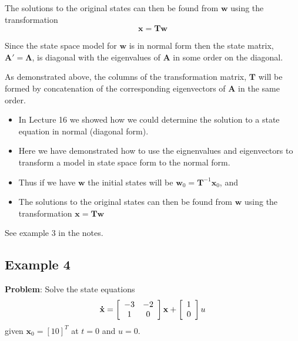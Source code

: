 The solutions to the original states can then be found from $\mathbf{w}$ using the transformation
\[
\mathbf{x}=\mathbf{Tw}
\]

Since the state space model for $\mathbf{w}$ is in normal form then the state matrix, $\mathbf{A}' = \mathbf{\Lambda}$, is diagonal with the eigenvalues of $\mathbf{A}$ in some order on the diagonal. 

As demonstrated above, the columns of the transformation matrix,  $\mathbf{T}$  will be formed by concatenation of the corresponding eigenvectors of $\mathbf{A}$ in the same order.
\ifslidesonly
\begin{slide}
   \begin{itemize}
   	\item In Lecture 16 we showed how we could determine the solution to a state equation in normal (diagonal form).
   	\item Here we have demonstrated how to use the eignenvalues and eigenvectors to transform a model in state space form to the normal form.
   	\item Thus if we have $\mathbf{w}$ the initial states will be $\mathbf{w}_0=\mathbf{T}^{-1}\mathbf{x}_0$, and
   	\item The solutions to the original states can then be found from $\mathbf{w}$ using the transformation $\mathbf{x}=\mathbf{Tw}$
\end{itemize}
See example 3 in the notes.
\end{slide}
\fi

\subsection*{Example 4} %
\label{sub:example_3}
\textbf{Problem}: Solve the state equations
\[
{\bf{\dot x}} = \left[ {\begin{array}{*{20}c}
   { - 3} & { - 2}  \\
   1 & 0  \\
\end{array}} \right]{\bf{x}} + \left[ {\begin{array}{*{20}c}
   1  \\
   0  \\
\end{array}} \right]u
\]
given $\mathbf{x}_0 = [1 0]^T$ at $t=0$  and  $u=0$.


